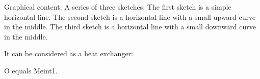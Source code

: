 Graphical content: A series of three sketches. The first sketch is a simple horizontal line. The second sketch is a horizontal line with a small upward curve in the middle. The third sketch is a horizontal line with a small downward curve in the middle.

It can be considered as a heat exchanger:

O equals Meint1.